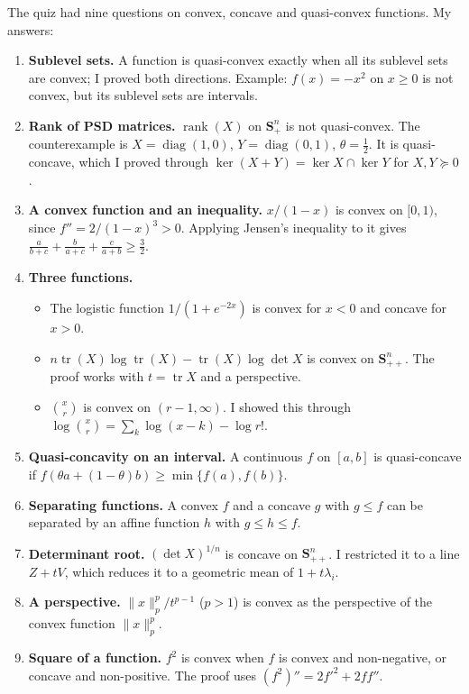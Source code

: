 



The quiz had nine questions on convex, concave and quasi-convex functions. My answers:
\begin{enumerate}
  \item \textbf{Sublevel sets.} A function is quasi-convex exactly when all its sublevel sets are convex; I proved both directions. Example: $f(x)=-x^2$ on $x\ge 0$ is not convex, but its sublevel sets are intervals.
  \item \textbf{Rank of PSD matrices.} $\operatorname{rank}(X)$ on $\mathbf{S}^n_+$ is not quasi-convex. The counterexample is $X=\operatorname{diag}(1,0)$, $Y=\operatorname{diag}(0,1)$, $\theta=\tfrac12$. It is quasi-concave, which I proved through $\ker(X+Y)=\ker X\cap\ker Y$ for $X,Y\succeq 0$.
  \item \textbf{A convex function and an inequality.} $x/(1-x)$ is convex on $[0,1)$, since $f''=2/(1-x)^3>0$. Applying Jensen's inequality to it gives $\frac{a}{b+c}+\frac{b}{a+c}+\frac{c}{a+b}\ge\frac32$.
  \item \textbf{Three functions.}
    \begin{itemize}
      \item The logistic function $1/(1+e^{-2x})$ is convex for $x<0$ and concave for $x>0$.
      \item $n\operatorname{tr}(X)\log\operatorname{tr}(X)-\operatorname{tr}(X)\log\det X$ is convex on $\mathbf{S}^n_{++}$. The proof works with $t=\operatorname{tr}X$ and a perspective.
      \item $\binom{x}{r}$ is convex on $(r-1,\infty)$. I showed this through $\log\binom{x}{r}=\sum_k \log(x-k)-\log r!$.
    \end{itemize}
  \item \textbf{Quasi-concavity on an interval.} A continuous $f$ on $[a,b]$ is quasi-concave if $f(\theta a+(1-\theta)b)\ge\min\{f(a),f(b)\}$.
  \item \textbf{Separating functions.} A convex $f$ and a concave $g$ with $g\le f$ can be separated by an affine function $h$ with $g\le h\le f$.
  \item \textbf{Determinant root.} $(\det X)^{1/n}$ is concave on $\mathbf{S}^n_{++}$. I restricted it to a line $Z+tV$, which reduces it to a geometric mean of $1+t\lambda_i$.
  \item \textbf{A perspective.} $\|x\|_p^p/t^{p-1}$ ($p>1$) is convex as the perspective of the convex function $\|x\|_p^p$.
  \item \textbf{Square of a function.} $f^2$ is convex when $f$ is convex and non-negative, or concave and non-positive. The proof uses $(f^2)''=2f'^2+2ff''$.
\end{enumerate}

